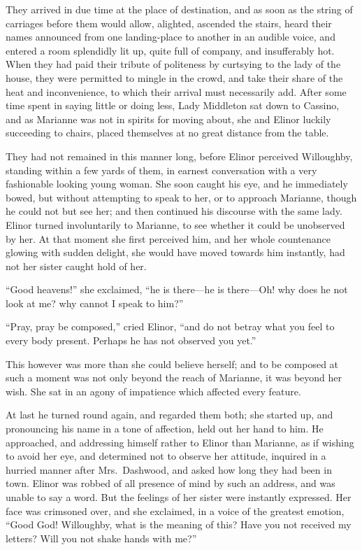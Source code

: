 They arrived in due time at the place of destination,
and as soon as the string of carriages before them
would allow, alighted, ascended the stairs, heard their
names announced from one landing-place to another in an
audible voice, and entered a room splendidly lit up,
quite full of company, and insufferably hot.  When they had
paid their tribute of politeness by curtsying to the lady
of the house, they were permitted to mingle in the crowd,
and take their share of the heat and inconvenience, to
which their arrival must necessarily add.  After some time
spent in saying little or doing less, Lady Middleton sat
down to Cassino, and as Marianne was not in spirits for
moving about, she and Elinor luckily succeeding to chairs,
placed themselves at no great distance from the table.

They had not remained in this manner long, before Elinor
perceived Willoughby, standing within a few yards
of them, in earnest conversation with a very fashionable
looking young woman.  She soon caught his eye, and he
immediately bowed, but without attempting to speak to her,
or to approach Marianne, though he could not but see her;
and then continued his discourse with the same lady.
Elinor turned involuntarily to Marianne, to see whether
it could be unobserved by her.  At that moment she first
perceived him, and her whole countenance glowing with
sudden delight, she would have moved towards him instantly,
had not her sister caught hold of her.

``Good heavens!'' she exclaimed, ``he is there---he
is there---Oh! why does he not look at me? why cannot
I speak to him?''

``Pray, pray be composed,'' cried Elinor, ``and do
not betray what you feel to every body present.
Perhaps he has not observed you yet.''

This however was more than she could believe herself;
and to be composed at such a moment was not only beyond
the reach of Marianne, it was beyond her wish.  She sat
in an agony of impatience which affected every feature.

At last he turned round again, and regarded them both;
she started up, and pronouncing his name in a tone
of affection, held out her hand to him.  He approached,
and addressing himself rather to Elinor than Marianne,
as if wishing to avoid her eye, and determined not to
observe her attitude, inquired in a hurried manner after
Mrs.\ Dashwood, and asked how long they had been in town.
Elinor was robbed of all presence of mind by such an address,
and was unable to say a word.  But the feelings of her sister
were instantly expressed.  Her face was crimsoned over,
and she exclaimed, in a voice of the greatest emotion,
``Good God! Willoughby, what is the meaning of this?
Have you not received my letters?  Will you not shake
hands with me?''

